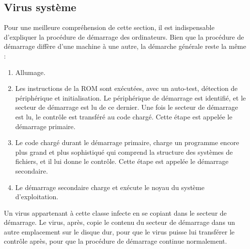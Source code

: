 
    \subsection{Virus système}
    Pour une meilleure compréhension de cette section, il est indispensable d'expliquer la procédure 
    de démarrage des ordinateurs. Bien que la procédure de démarrage diffère d'une machine à une autre, 
    la démarche générale reste la même : \cite{virus} %
    \begin{enumerate}
        \item Allumage. %
        \item Les instructions de la ROM sont exécutées, avec un auto-test, détection de périphérique et 
            initialisation. Le périphérique de démarrage est identifié, et le secteur de démarrage est 
            lu de ce dernier. Une fois le secteur de démarrage est lu, le contrôle est transféré au code chargé. 
            Cette étape est appelée le démarrage primaire. %
        \item Le code chargé durant le démarrage primaire, charge un programme encore plus grand et plus sophistiqué 
            qui comprend la structure des systèmes de fichiers, et il lui donne le contrôle. Cette étape est appelée
            le démarrage secondaire. %
        \item Le démarrage secondaire charge et exécute le noyau du système d'exploitation. %
    \end{enumerate}
    
    Un virus appartenant à cette classe infecte en se copiant dans le secteur de démarrage. Le virus, après,
    copie le contenu du secteur de démarrage dans un autre emplacement sur le disque dur, pour que le virus 
    puisse lui transférer le contrôle après, pour que la procédure de démarrage continue normalement.
    \cite{virus} %

